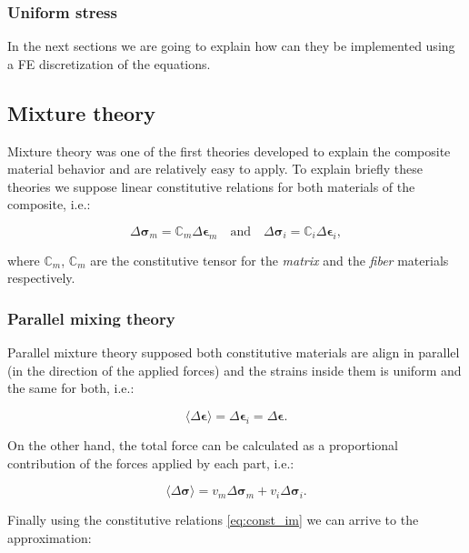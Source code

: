 \documentclass[review]{elsarticle}
\begin{document}
\subsubsection{Uniform stress}

In the next sections we are going to explain how can they be implemented using a FE discretization of the equations.

\subsection{Mixture theory}

Mixture theory was one of the first theories developed to explain the composite
material behavior and are relatively easy to apply. 
To explain briefly these theories we suppose linear constitutive relations for 
both materials of the composite, i.e.:

\begin{equation}
\Delta \bm{\sigma}_m = \mathbb{C}_m  \Delta \bm{\epsilon}_m 
\quad\text{and}\quad 
\Delta \bm{\sigma}_i = \mathbb{C}_i  \Delta \bm{\epsilon}_i,
\label{eq:const_im}
\end{equation}

\noindent
where $\mathbb{C}_m$, $\mathbb{C}_m$ are the constitutive tensor for the
\emph{matrix} and the \emph{fiber} materials respectively.

\subsubsection{Parallel mixing theory}

Parallel mixture theory supposed both constitutive materials are align in parallel (in the
direction of the applied forces) and the
strains inside them is uniform and the same for both, i.e.:

\begin{equation}
\langle\Delta \bm{\epsilon}\rangle = \Delta \bm{\epsilon}_i = \Delta \bm{\epsilon}.
\end{equation}

\noindent
On the other hand, the total force can be calculated as a proportional
contribution of the forces applied by each part, i.e.:

\begin{equation}
\langle\Delta \bm{\sigma}\rangle  = v_m \Delta \bm{\sigma}_m + v_i \Delta \bm{\sigma}_i.
\end{equation}

Finally using the constitutive relations \ref{eq:const_im} we can arrive to the
approximation:
\end{document}
